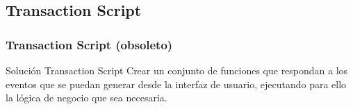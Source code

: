 \documentclass[a4paper,slidestop,xcolor=pst,dvips,blue]{beamer}
\begin{document}
%
%

\subsection{Transaction Script}

\begin{frame}[c]
    \frametitle{Transaction Script (obsoleto)}
    \begin{block}{Solución Transaction Script}
        Crear un conjunto de funciones que respondan a los eventos que se puedan generar
        desde la interfaz de usuario, ejecutando para ello la lógica de negocio que sea necesaria.
    \end{block}
\end{frame}
\end{document}
